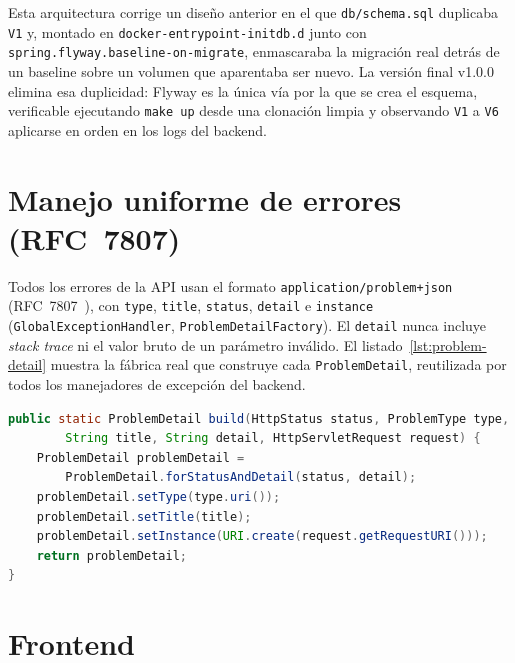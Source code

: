 Esta arquitectura corrige un dise\~no anterior en el que \texttt{db/schema.sql}
duplicaba \texttt{V1} y, montado en \texttt{docker-entrypoint-initdb.d} junto
con \texttt{spring.\allowbreak flyway.\allowbreak baseline-on-migrate}, enmascaraba la migraci\'on
real detr\'as de un baseline sobre un volumen que aparentaba ser nuevo. La
versi\'on final v1.0.0 elimina esa duplicidad: Flyway es la \'unica v\'ia
por la que se crea el esquema, verificable ejecutando \texttt{make up}
desde una clonaci\'on limpia y observando \texttt{V1} a \texttt{V6}
aplicarse en orden en los logs del backend.

\section{Manejo uniforme de errores (RFC~7807)}

Todos los errores de la API usan el formato \texttt{application/problem+json}
(RFC~7807~\cite{rfc7807}), con \texttt{type}, \texttt{title},
\texttt{status}, \texttt{detail} e \texttt{instance}
(\texttt{GlobalExceptionHandler}, \texttt{ProblemDetailFactory}). El
\texttt{detail} nunca incluye \emph{stack trace} ni el valor bruto de un
par\'ametro inv\'alido. El listado~\ref{lst:problem-detail} muestra la
f\'abrica real que construye cada \texttt{ProblemDetail}, reutilizada por
todos los manejadores de excepci\'on del backend.

\begin{lstlisting}[language=Java,caption={F\'abrica de errores RFC~7807 en \texttt{ProblemDetailFactory.java} (fragmento real).},label={lst:problem-detail}]
public static ProblemDetail build(HttpStatus status, ProblemType type,
        String title, String detail, HttpServletRequest request) {
    ProblemDetail problemDetail =
        ProblemDetail.forStatusAndDetail(status, detail);
    problemDetail.setType(type.uri());
    problemDetail.setTitle(title);
    problemDetail.setInstance(URI.create(request.getRequestURI()));
    return problemDetail;
}
\end{lstlisting}

\section{Frontend}

